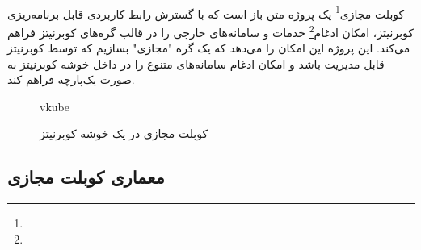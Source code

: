 \paragraph{}
{
    کوبلت مجازی\footnote{}\cite{VIRTUALKUBELET} یک پروژه متن باز است که با گسترش رابط‌ کاربردی قابل برنامه‌ریزی کوبرنیتز، امکان ادغام\footnote{} خدمات و سامانه‌های خارجی را در قالب گره‌های کوبرنیتز فراهم می‌کند. این پروژه این امکان را می‌دهد که یک گره "مجازی" بسازیم که توسط کوبرنیتز قابل مدیریت باشد و امکان ادغام سامانه‌های متنوع را در داخل خوشه کوبرنیتز به صورت یک‌پارچه فراهم کند.    
    \begin{figure}[H]
     \caption{کوبلت مجازی در یک خوشه کوبرنیتز}
     \label{fig:virtkublet_arch}vkube
    \end{figure}
}

\subsection{معماری کوبلت مجازی}
\label{subsec:vkube_arch}
